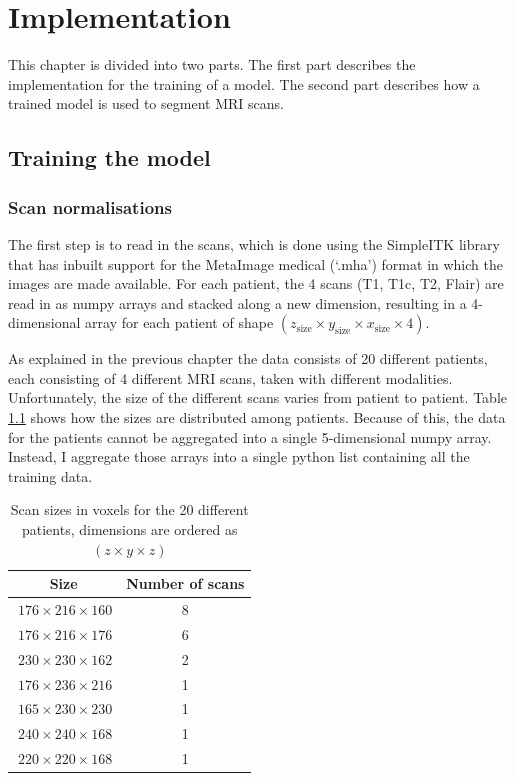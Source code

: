 \documentclass[12pt,a4paper,twoside,openright]{report}
\begin{document}
\chapter{Implementation}
This chapter is divided into two parts. The first part describes the implementation for the training of a model. The second part describes how a trained model is used to segment MRI scans.

\section{Training the model}
\subsection{Scan normalisations}
\label{section:scan_normalisations}
The first step is to read in the scans, which is done using the SimpleITK library that has inbuilt support for the MetaImage medical (`.mha') format in which the images are made available. For each patient, the 4 scans (T1, T1c, T2, Flair) are read in as numpy arrays and stacked along a new dimension, resulting in a 4-dimensional array for each patient of shape $(z_{\text{size}} \times y_{\text{size}} \times x_{\text{size}} \times 4)$.
 
As explained in the previous chapter the data consists of 20 different patients, each consisting of 4 different MRI scans, taken with different modalities. Unfortunately, the size of the different scans varies from patient to patient. Table \ref{table:scan_sizes} shows how the sizes are distributed among patients. Because of this, the data for the patients cannot be aggregated into a single 5-dimensional numpy array. Instead, I aggregate those arrays into a single python list containing all the training data.

\begin{table}[h]
\centering	
\begin{tabular}{ c c } 
\textbf{Size} & \textbf{Number of scans}\\
 \hline
 $\ 176 \times 216 \times 160$ & 8 \\ 
 $\ 176 \times 216 \times 176$ & 6 \\ 
 $\ 230 \times 230 \times 162$ & 2 \\ 
 $\ 176 \times 236 \times 216$ & 1 \\ 
 $\ 165 \times 230 \times 230$ & 1 \\ 
 $\ 240 \times 240 \times 168$ & 1 \\ 
 $\ 220 \times 220 \times 168$ & 1 \\ 
\end{tabular}
\caption{Scan sizes in voxels for the 20 different patients, dimensions are ordered as $(z \times y \times z)$}
\label{table:scan_sizes}
\end{table}
\end{document}
